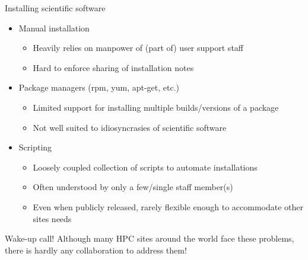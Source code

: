\documentclass[10pt,xcolor={usenames,dvipsnames}]{beamer}
\begin{document}
\begin{frame}{Installing scientific software}
\begin{itemize}
    \item
        Manual installation
        \begin{itemize}
            \item
                Heavily relies on manpower of (part of) user support staff
            \item
                Hard to enforce sharing of installation notes
        \end{itemize}
    \item
        Package managers (rpm, yum, apt-get, etc.)
        \begin{itemize}
            \item
                Limited support for installing multiple builds/versions of a
                package
            \item
                Not well suited to idiosyncrasies of scientific software
        \end{itemize}
    \item
        Scripting
        \begin{itemize}
            \item
                Loosely coupled collection of scripts to automate installations
            \item
                Often understood by only a few/single staff member(s)
            \item
                Even when publicly released, rarely flexible enough to
                accommodate other sites needs
        \end{itemize}
\end{itemize}
\begin{center}
    \begin{minipage}{0.9\textwidth}
        \begin{alertblock}{Wake-up call!}
            \footnotesize
            Although many HPC sites around the world face these problems,
            there is hardly any collaboration to address them!
        \end{alertblock}
    \end{minipage}
\end{center}
\end{frame}

\end{document}
